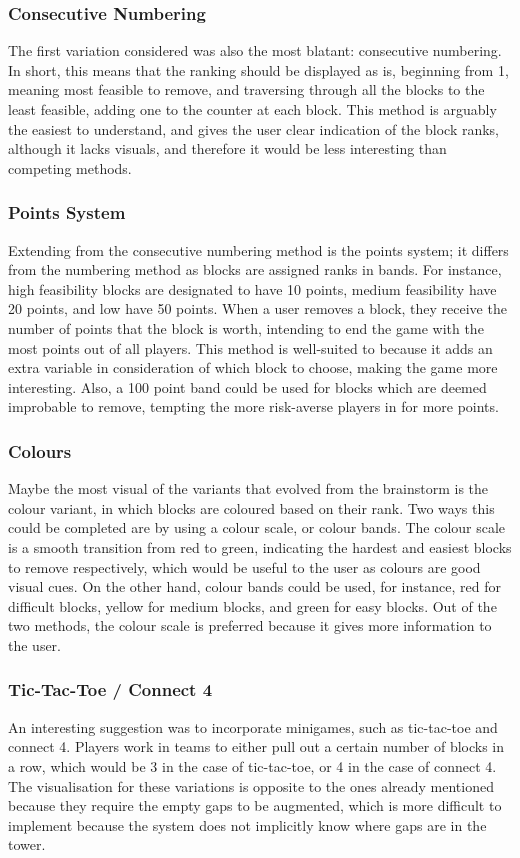 \subsubsection{Consecutive Numbering}
The first variation considered was also the most blatant: consecutive numbering. In short, this means that the ranking should be displayed as is, beginning from 1, meaning most feasible to remove, and traversing through all the blocks to the least feasible, adding one to the counter at each block. This method is arguably the easiest to understand, and gives the user clear indication of the block ranks, although it lacks visuals, and therefore it would be less interesting than competing methods.

\subsubsection{Points System}
Extending from the consecutive numbering method is the points system; it differs from the numbering method as blocks are assigned ranks in bands. For instance, high feasibility blocks are designated to have 10 points, medium feasibility have 20 points, and low have 50 points. When a user removes a block, they receive the number of points that the block is worth, intending to end the game with the most points out of all players. This method is well-suited to \jenga{} because it adds an extra variable in consideration of which block to choose, making the game more interesting. Also, a 100 point band could be used for blocks which are deemed improbable to remove, tempting the more risk-averse players in for more points.

\subsubsection{Colours}
Maybe the most visual of the variants that evolved from the brainstorm is the colour variant, in which blocks are coloured based on their rank. Two ways this could be completed are by using a colour scale, or colour bands. The colour scale is a smooth transition from red to green, indicating the hardest and easiest blocks to remove respectively, which would be useful to the user as colours are good visual cues. On the other hand, colour bands could be used, for instance, red for difficult blocks, yellow for medium blocks, and green for easy blocks. Out of the two methods, the colour scale is preferred because it gives more information to the user.

\subsubsection{Tic-Tac-Toe / Connect 4}
An interesting suggestion was to incorporate minigames, such as tic-tac-toe and connect 4. Players work in teams to either pull out a certain number of blocks in a row, which would be 3 in the case of tic-tac-toe, or 4 in the case of connect 4. The visualisation for these variations is opposite to the ones already mentioned because they require the empty gaps to be augmented, which is more difficult to implement because the system does not implicitly know where gaps are in the tower.

